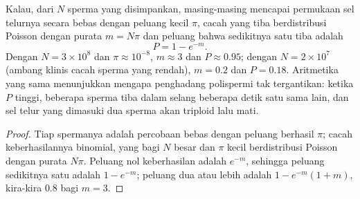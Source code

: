 \begin{theorem}\label{thm:b2:mammal-reproduction:poisson}
Kalau, dari $N$ sperma yang disimpankan, masing-masing mencapai
permukaan sel telurnya secara bebas dengan peluang kecil $\pi$, cacah
yang tiba berdistribusi Poisson dengan purata $m = N\pi$ dan peluang
bahwa sedikitnya satu tiba adalah
\[
P = 1 - e^{-m}.
\]
Dengan $N = 3\times 10^{8}$ dan $\pi \approx 10^{-8}$, $m \approx 3$
dan $P \approx 0.95$; dengan $N = 2\times 10^{7}$ (ambang klinis
cacah sperma yang rendah), $m = 0.2$ dan $P = 0.18$. Aritmetika yang
sama menunjukkan mengapa penghadang polispermi tak tergantikan: ketika
$P$ tinggi, beberapa sperma tiba dalam selang beberapa detik satu sama
lain, dan sel telur yang dimasuki dua sperma akan triploid lalu mati.
\end{theorem}
\begin{proof}
Tiap spermanya adalah percobaan bebas dengan peluang berhasil $\pi$;
cacah keberhasilannya binomial, yang bagi $N$ besar dan $\pi$ kecil
berdistribusi Poisson dengan purata $N\pi$. Peluang nol
keberhasilan adalah $e^{-m}$, sehingga peluang sedikitnya satu adalah
$1 - e^{-m}$; peluang dua atau lebih adalah $1 - e^{-m}(1 + m)$,
kira-kira $0.8$ bagi $m = 3$.
\end{proof}

